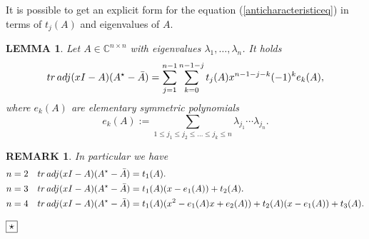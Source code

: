 \documentclass[10pt,a4paper,reqno]{amsart}
\newtheorem{lm}[defi]{\bf L\scriptsize EMMA \normalsize}
\newtheorem{rem}[defi]{\bf R\scriptsize EMARK \normalsize}
\def\kopr{\hfill\raisebox{3pt}{\framebox{$\star$}}}
\newenvironment{remark}{\begin{rem}\rm}{$\kopr$\end{rem}}
\newenvironment{lemma}{\begin{lm}\it}{\end{lm}}
\newcommand{\tr}{{\rm tr}\,}
\begin{document}
It is possible to get an explicit form for the equation (\ref{anticharacteristiceq}) in terms of $t_j(A)$ and eigenvalues of $A$.
\begin{lemma}
Let $A\in\mathbb{C}^{n\times n}$ with eigenvalues $\lambda_1,\dots, \lambda_n$. It holds
\begin{equation}\label{anticharexplicit}
\tr {\rm adj}(xI-A)(A^\star -\bar A)=\sum_{j=1}^{n-1}\sum_{k=0}^{n-1-j}t_j(A)x^{n-1-j-k}(-1)^k e_k(A),
\end{equation}
where $e_k(A)$ are elementary symmetric polynomials
$$
e_k(A):=\sum_{1\leq j_1\leq j_2\leq\dots \leq j_k\leq n }\lambda_{j_1}\cdots \lambda_{j_n}.
$$
\end{lemma}
\begin{remark}
In particular we have
\begin{align}
n&=2 & \tr {\rm adj}(x I-A)(A^\star-\bar A)&=t_1(A).\\
n&=3 & \tr {\rm adj}(x I-A)(A^\star-\bar A)&=t_1(A)(x-e_1(A))+t_2(A).\\
n&=4 & \tr {\rm adj}(x I-A)(A^\star-\bar A)&=t_1(A)(x^2-e_1(A)x+e_2(A))+t_2(A)(x-e_1(A))+t_3(A).
\end{align}

\end{remark}
\end{document}
